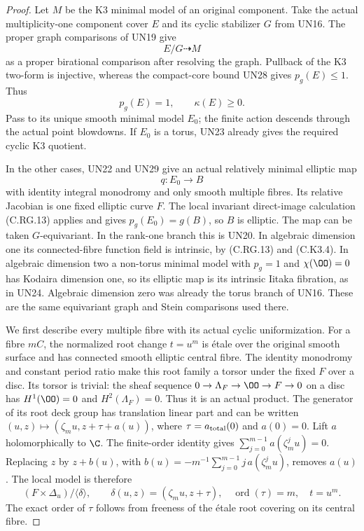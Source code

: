 \begin{proof}
Let $M$ be the K3 minimal model of an original
component. Take the actual multiplicity-one
component cover $E$ and its cyclic stabilizer
$G$ from UN16. The proper graph comparisons
of UN19 give
\[
                         E/G\dashrightarrow M
                                                               \tag{C.KX.1}
\]
as a proper birational comparison after
resolving the graph. Pullback of the K3
two-form is injective, whereas the
compact-core bound UN28 gives $p_g(E)\le1$.
Thus
\[
                       p_g(E)=1,\qquad\kappa(E)\ge0.
                                                               \tag{C.KX.2}
\]
Pass to its unique smooth minimal model
$E_0$; the finite action descends through
the actual point blowdowns.
If $E_0$ is a torus, UN23 already gives
the required cyclic K3 quotient.

In the other cases, UN22 and UN29 give
an actual relatively minimal elliptic map
\[
                   q:E_0\longrightarrow B
                                                               \tag{C.KX.3}
\]
with identity integral monodromy and
only smooth multiple fibres. Its
relative Jacobian is one fixed elliptic
curve $F$. The local invariant
direct-image calculation (C.RG.13)
applies and gives
$p_g(E_0)=g(B)$, so $B$ is elliptic.
The map can be taken $G$-equivariant.
In the rank-one branch this is UN20.
In algebraic dimension one its
connected-fibre function field is
intrinsic, by (C.RG.13) and
(C.K3.4). In algebraic dimension
two a non-torus minimal model
with $p_g=1$ and $\chi(\OO)=0$
has Kodaira dimension one, so
its elliptic map is its intrinsic
Iitaka fibration, as in UN24.
Algebraic dimension zero was
already the torus branch of UN16.
These are the same equivariant
graph and Stein comparisons
used there.

We first describe every multiple
fibre with its actual cyclic
uniformization. For a fibre $mC$,
the normalized root change
$t=u^m$ is \'etale over the
original smooth surface and
has connected smooth elliptic
central fibre. The identity
monodromy and constant period
ratio make this root family
a torsor under the fixed $F$
over a disc. Its torsor is
trivial: the sheaf sequence
$0\to\Lambda_F\to\OO\to F\to0$
on a disc has $H^1(\OO)=0$
and $H^2(\Lambda_F)=0$.
Thus it is an actual product.
The generator of its root
deck group has translation
linear part and can be
written
$(u,z)\mapsto(\zeta_m u,z+\tau+a(u))$,
where $\tau=a_{\rm total}(0)$
and $a(0)=0$.
Lift $a$ holomorphically to
$\C$. The finite-order
identity gives
$\sum_{j=0}^{m-1}a(\zeta_m^ju)=0$.
Replacing $z$ by $z+b(u)$,
with
$b(u)=-m^{-1}\sum_{j=0}^{m-1}j\,a(\zeta_m^ju)$,
removes $a(u)$.
The local model is therefore
\[
 (F\times\Delta_u)/\langle\delta\rangle,
 \qquad
 \delta(u,z)=(\zeta_m u,z+\tau),\quad
 \operatorname{ord}(\tau)=m,\quad t=u^m .
                                                               \tag{C.KX.4}
\]
The exact order of $\tau$
follows from freeness of
the \'etale root covering
on its central fibre.


\end{proof}

